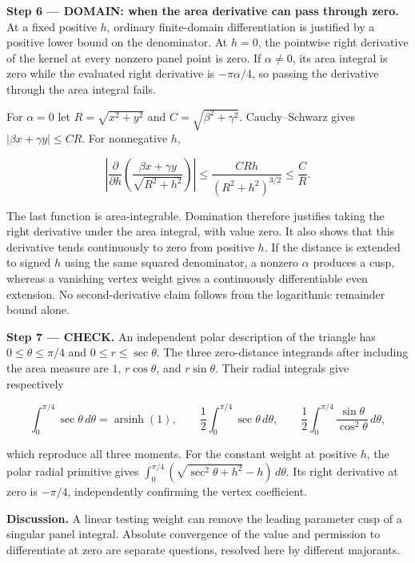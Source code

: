 \documentclass[11pt,oneside,openany]{book}
\begin{document}
\begin{DomainStep}
\textbf{Step 6 --- DOMAIN: when the area derivative can pass through zero.} At a fixed positive \(h\), ordinary finite-domain differentiation is justified by a positive lower bound on the denominator. At \(h=0\), the pointwise right derivative of the kernel at every nonzero panel point is zero. If \(\alpha\ne0\), its area integral is zero while the evaluated right derivative is \(-\pi\alpha/4\), so passing the derivative through the area integral fails.

For \(\alpha=0\) let \(R=\sqrt{x^2+y^2}\) and \(C=\sqrt{\beta^2+\gamma^2}\). Cauchy--Schwarz gives \(|\beta x+\gamma y|\le CR\). For nonnegative \(h\),

\[
\left|\frac{\partial}{\partial h}
\left(\frac{\beta x+\gamma y}{\sqrt{R^2+h^2}}\right)\right|
\le\frac{CRh}{(R^2+h^2)^{3/2}}
\le\frac C R.
\]

The last function is area-integrable. Domination therefore justifies taking the right derivative under the area integral, with value zero. It also shows that this derivative tends continuously to zero from positive \(h\). If the distance is extended to signed \(h\) using the same squared denominator, a nonzero \(\alpha\) produces a cusp, whereas a vanishing vertex weight gives a continuously differentiable even extension. No second-derivative claim follows from the logarithmic remainder bound alone.

\end{DomainStep}
\textbf{Step 7 --- CHECK.} An independent polar description of the triangle has \(0\le\theta\le\pi/4\) and \(0\le r\le\sec\theta\). The three zero-distance integrands after including the area measure are \(1\), \(r\cos\theta\), and \(r\sin\theta\). Their radial integrals give respectively

\[
\int_0^{\pi/4}\sec\theta\,d\theta=\operatorname{arsinh}(1),\qquad
\frac12\int_0^{\pi/4}\sec\theta\,d\theta,\qquad
\frac12\int_0^{\pi/4}\frac{\sin\theta}{\cos^2\theta}\,d\theta,
\]

which reproduce all three moments. For the constant weight at positive \(h\), the polar radial primitive gives
\(\int_0^{\pi/4}(\sqrt{\sec^2\theta+h^2}-h)\,d\theta\).
Its right derivative at zero is \(-\pi/4\), independently confirming the vertex coefficient.

\textbf{Discussion.} A linear testing weight can remove the leading parameter cusp of a singular panel integral. Absolute convergence of the value and permission to differentiate at zero are separate questions, resolved here by different majorants.
\clearpage
\end{document}
